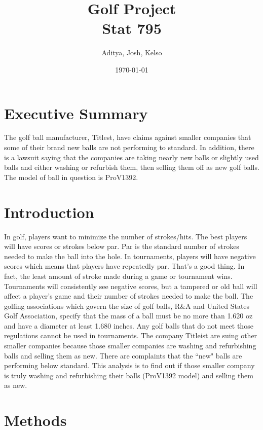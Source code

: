 \documentclass{article}\usepackage[]{graphicx}\usepackage[]{color}
\title{Golf Project \\
\large Stat 795}
\author{Aditya, Josh, Kelso}
\date{\today}
\makeatletter
\newcommand{\doublespacing}{\let\CS=\@currsize\renewcommand{
		\baselinestretch}{1.2}\small\CS}
\makeatother
\begin{document}
 
\maketitle




\doublespacing


\section*{Executive Summary}


The golf ball manufacturer, Titlest, have claims against smaller companies that some of their brand new balls are not performing to standard. In addition, there is a lawsuit saying that the companies are taking nearly new balls or slightly used balls and either washing or refurbish them, then selling them off as new golf balls. The model of ball in question is ProV1392. 

\section*{Introduction}

In golf, players want to minimize the number of strokes/hits. The best players will have scores or strokes below par. Par is the standard number of strokes needed to make the ball into the hole. In tournaments, players will have negative scores which means that players have repeatedly par. That’s a good thing. In fact, the least amount of stroke made during a game or tournament wins. Tournaments will consistently see negative scores, but a tampered or old ball will affect a player’s game and their number of strokes needed to make the ball.   
The golfing associations which govern the size of golf balls, R\&A and United States Golf Association, specify that the mass of a ball must be no more than 1.620 oz and have a diameter at least 1.680 inches. Any golf balls that do not meet those regulations cannot be used in tournaments. The company Titleist are suing other smaller companies because those smaller companies are washing and refurbishing balls and selling them as new. There are complaints that the ``new" balls are performing below standard. This analysis is to find out if those smaller company is truly washing and refurbishing their balls (ProV1392 model) and selling them as new. 

\section*{Methods}
\end{document}
